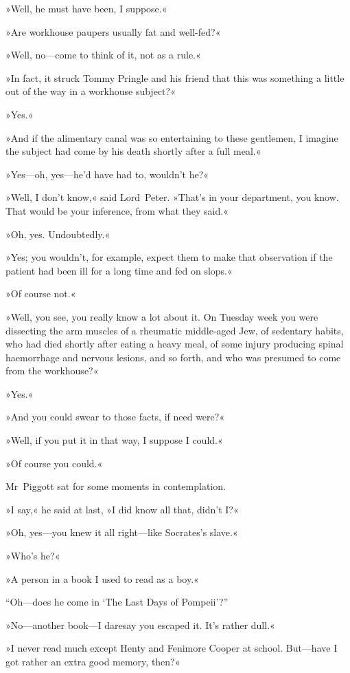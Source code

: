 »Well, he must have been, I suppose.«

»Are workhouse paupers usually fat and well-fed?«

»Well, no—come to think of it, not as a rule.«

»In fact, it struck Tommy Pringle and his friend that this was something a little out of the way in a workhouse subject?«

»Yes.«

»And if the alimentary canal was so entertaining to these gentlemen, I imagine the subject had come by his death shortly after a full meal.«

»Yes—oh, yes—he'd have had to, wouldn't he?«

»Well, I don't know,« said Lord~Peter. »That's in your department, you know. That would be your inference, from what they said.«

»Oh, yes. Undoubtedly.«

»Yes; you wouldn't, for example, expect them to make that observation if the patient had been ill for a long time and fed on slops.«

»Of course not.«

»Well, you see, you really know a lot about it. On Tuesday week you were dissecting the arm muscles of a rheumatic middle-aged Jew, of sedentary habits, who had died shortly after eating a heavy meal, of some injury producing spinal haemorrhage and nervous lesions, and so forth, and who was presumed to come from the workhouse?«

»Yes.«

»And you could swear to those facts, if need were?«

»Well, if you put it in that way, I suppose I could.«

»Of course you could.«

Mr~Piggott sat for some moments in contemplation.

»I say,« he said at last, »I did know all that, didn't I?«

»Oh, yes—you knew it all right—like Socrates's slave.«

»Who's he?«

»A person in a book I used to read as a boy.«

“Oh—does he come in ‘The Last Days of Pompeii'?”

»No—another book—I daresay you escaped it. It's rather dull.«

»I never read much except Henty and Fenimore Cooper at school\textellipsis . But—have I got rather an extra good memory, then?«

